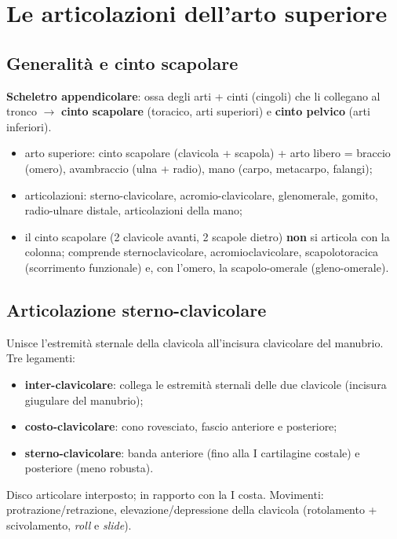 \chapter{Le articolazioni dell'arto superiore}

\section{Generalità e cinto scapolare}

\textbf{Scheletro appendicolare}: ossa degli arti + cinti (cingoli) che li collegano al tronco
$\rightarrow$ \textbf{cinto scapolare} (toracico, arti superiori) e \textbf{cinto pelvico} (arti
inferiori).
\begin{itemize}
  \item arto superiore: cinto scapolare (clavicola + scapola) + arto libero = braccio (omero),
    avambraccio (ulna + radio), mano (carpo, metacarpo, falangi);
  \item articolazioni: sterno-clavicolare, acromio-clavicolare, glenomerale, gomito, radio-ulnare
    distale, articolazioni della mano;
  \item il cinto scapolare (2 clavicole avanti, 2 scapole dietro) \textbf{non} si articola con la
    colonna; comprende sternoclavicolare, acromioclavicolare, scapolotoracica (scorrimento
    funzionale) e, con l'omero, la scapolo-omerale (gleno-omerale).
\end{itemize}

\section{Articolazione sterno-clavicolare}

Unisce l'estremità sternale della clavicola all'incisura clavicolare del manubrio. Tre legamenti:
\begin{itemize}
  \item \textbf{inter-clavicolare}: collega le estremità sternali delle due clavicole (incisura
    giugulare del manubrio);
  \item \textbf{costo-clavicolare}: cono rovesciato, fascio anteriore e posteriore;
  \item \textbf{sterno-clavicolare}: banda anteriore (fino alla I cartilagine costale) e posteriore
    (meno robusta).
\end{itemize}
Disco articolare interposto; in rapporto con la I costa. Movimenti: protrazione/retrazione,
elevazione/depressione della clavicola (rotolamento + scivolamento, \textit{roll} e \textit{slide}).

